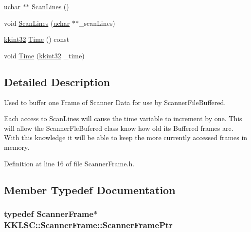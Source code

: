 \begin{DoxyCompactItemize}
\hyperlink{namespace_k_k_b_ace9969169bf514f9ee6185186949cdf7}{uchar} $\ast$$\ast$ \hyperlink{class_k_k_l_s_c_1_1_scanner_frame_a04e6b7bfa7d7770ce21bebf268668443}{Scan\+Lines} ()
\item 
void \hyperlink{class_k_k_l_s_c_1_1_scanner_frame_ad69bc7f1755b40ace38e258b9d7a74e7}{Scan\+Lines} (\hyperlink{namespace_k_k_b_ace9969169bf514f9ee6185186949cdf7}{uchar} $\ast$$\ast$\+\_\+scan\+Lines)
\item 
\hyperlink{namespace_k_k_b_a8fa4952cc84fda1de4bec1fbdd8d5b1b}{kkint32} \hyperlink{class_k_k_l_s_c_1_1_scanner_frame_aad715583bf4119e5fb70758e4bc7bd23}{Time} () const 
\item 
void \hyperlink{class_k_k_l_s_c_1_1_scanner_frame_a02cf95fb2b96d54fb0f178aaf777c131}{Time} (\hyperlink{namespace_k_k_b_a8fa4952cc84fda1de4bec1fbdd8d5b1b}{kkint32} \+\_\+time)
\end{DoxyCompactItemize}


\subsection{Detailed Description}
Used to buffer one Frame of Scanner Data for use by \textquotesingle{}Scanner\+File\+Buffered\textquotesingle{}. 

Each access to \textquotesingle{}Scan\+Lines\textquotesingle{} will cause the \textquotesingle{}time\textquotesingle{} variable to increment by one. This will allow the \textquotesingle{}Scanner\+Fle\+Bufered\textquotesingle{} class know how old its Buffered frames are. With this knowledge it will be able to keep the more currently accessed frames in memory. 

Definition at line 16 of file Scanner\+Frame.\+h.



\subsection{Member Typedef Documentation}
\subsubsection[{\texorpdfstring{Scanner\+Frame\+Ptr}{ScannerFramePtr}}]{\setlength{\rightskip}{0pt plus 5cm}typedef {\bf Scanner\+Frame}$\ast$ {\bf K\+K\+L\+S\+C\+::\+Scanner\+Frame\+::\+Scanner\+Frame\+Ptr}}\hypertarget{class_k_k_l_s_c_1_1_scanner_frame_a1f74e8ccdefff626991fd1d68ff00362}{}\label{class_k_k_l_s_c_1_1_scanner_frame_a1f74e8ccdefff626991fd1d68ff00362}


